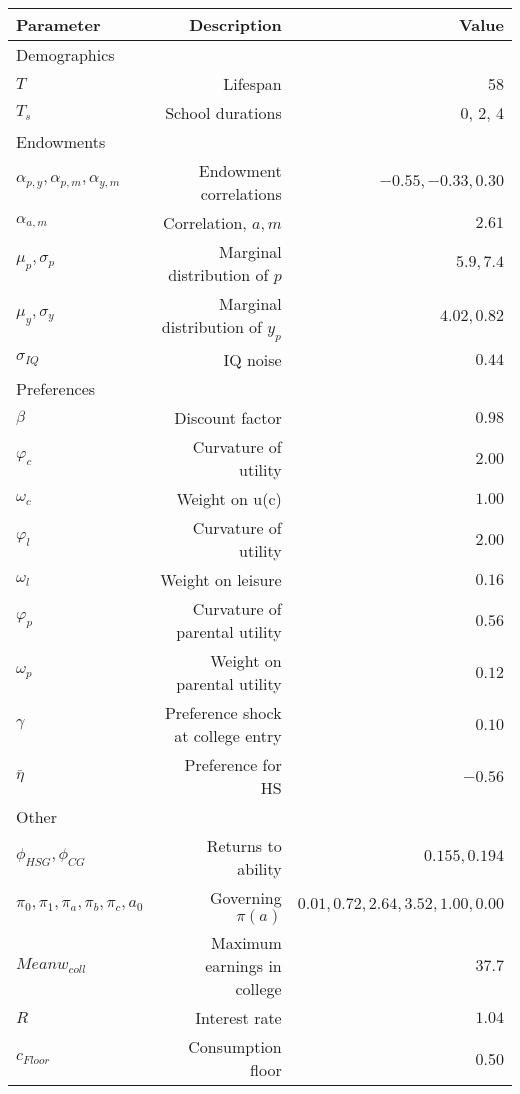 \begin{tabular}{lrr}
\hline
Parameter & Description  & Value  \\
\hline
Demographics &   &   \\
$T$ & Lifespan  & 58  \\
$T_{s}$ & School durations  & 0, 2, 4  \\
Endowments &   &   \\
$\alpha_{p,y}, \alpha_{p,m}, \alpha_{y,m}$ & Endowment correlations  & $-0.55, -0.33, 0.30$  \\
$\alpha_{a,m}$ & Correlation, $a,m$  & $2.61$  \\
$\mu_{p}, \sigma_{p}$ & Marginal distribution of $p$  & $5.9, 7.4$  \\
$\mu_{y}, \sigma_{y}$ & Marginal distribution of $y_{p}$  & $4.02, 0.82$  \\
$\sigma_{IQ}$ & IQ noise  & $0.44$  \\
Preferences &   &   \\
$\beta$ & Discount factor  & $0.98$  \\
$\varphi_{c}$ & Curvature of utility  & $2.00$  \\
$\omega_{c}$ & Weight on u(c)  & $1.00$  \\
$\varphi_{l}$ & Curvature of utility  & $2.00$  \\
$\omega_{l}$ & Weight on leisure  & $0.16$  \\
$\varphi_{p}$ & Curvature of parental utility  & $0.56$  \\
$\omega_{p}$ & Weight on parental utility  & $0.12$  \\
$\gamma$ & Preference shock at college entry  & $0.10$  \\
$\bar{\eta}$ & Preference for HS  & $-0.56$  \\
Other &   &   \\
$\phi_{HSG}, \phi_{CG}$ & Returns to ability  & $0.155, 0.194$  \\
$\pi_{0}, \pi_{1}, \pi_{a}, \pi_{b}, \pi_{c}, a_{0}$ & Governing $\pi(a)$  & $0.01, 0.72, 2.64, 3.52, 1.00, 0.00$  \\
$Mean w_{coll}$ & Maximum earnings in college  & $37.7$  \\
$R$ & Interest rate  & $1.04$  \\
$c_{Floor}$ & Consumption floor  & 0.50  \\
\hline
\end{tabular}%
